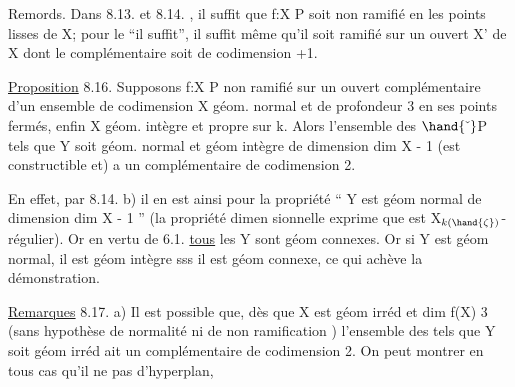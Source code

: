 

Remords. Dans 8.13. et 8.14. , il suffit  que f:X\hand{$\to$} P soit non
ramifié en les points lisses de X; pour le ``il suffit'', il suffit même
qu'il soit  ramifié sur un ouvert X' de X dont le complémentaire soit
de codimension \hand{$\geqslant$} +1.

\uline{Proposition} 8.16. Supposons f:X\hand{$\to$} P non ramifié sur un ouvert
complémentaire d'un ensemble de codimension  X géom. normal et
de profondeur\hand{$\geqslant$} 3 en ses points fermés, enfin X géom. intègre et propre
sur k. Alors l'ensemble des \hand{$\zeta \in$} $\hand{\check{\ }}$P tels que 
Y\hand{$_\zeta$} soit géom. normal et géom intègre de dimension dim X - 1 (est
constructible et) a un complémentaire de codimension \hand{$\geqslant$} 2.

En effet, par 8.14. b) il en est ainsi pour la propriété
`` Y\hand{$_\zeta$} est géom normal de dimension dim X - 1 '' (la propriété dimen
sionnelle exprime que \hand{$\phi_\zeta$} est X$_{k(\hand{\zeta})}$-régulier). Or en vertu de 6.1.
\uline{tous} les Y\hand{$_\zeta$} sont géom connexes. Or si Y\hand{$_\zeta$} est géom normal, il est
géom intègre sss il est géom connexe, ce qui achève la démonstration.

\uline{Remarques} 8.17. a)  Il est possible que, dès que X est géom irréd
et dim f(X) \hand{$\geqslant$} 3 (sans hypothèse de normalité ni de non ramification )
l'ensemble des \hand{$\zeta$} tels que Y\hand{$_\zeta$} soit géom irréd ait un complémentaire
de codimension \hand{$\geqslant$}2. On peut montrer en tous cas qu'il ne pas
d'hyperplan, 

